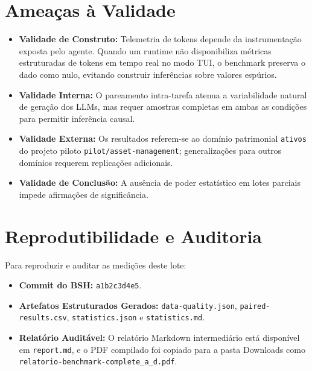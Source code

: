 \documentclass[10pt,a4paper]{article}
\begin{document}
\section{Ameaças à Validade}
\begin{itemize}
  \item \textbf{Validade de Construto:} Telemetria de tokens depende da instrumentação exposta pelo agente. Quando um runtime não disponibiliza métricas estruturadas de tokens em tempo real no modo TUI, o benchmark preserva o dado como nulo, evitando construir inferências sobre valores espúrios.
  \item \textbf{Validade Interna:} O pareamento intra-tarefa atenua a variabilidade natural de geração dos LLMs, mas requer amostras completas em ambas as condições para permitir inferência causal.
  \item \textbf{Validade Externa:} Os resultados referem-se ao domínio patrimonial \texttt{ativos} do projeto piloto \texttt{pilot/asset-management}; generalizações para outros domínios requerem replicações adicionais.
  \item \textbf{Validade de Conclusão:} A ausência de poder estatístico em lotes parciais impede afirmações de significância.
\end{itemize}

\section{Reprodutibilidade e Auditoria}
Para reproduzir e auditar as medições deste lote:
\begin{itemize}
  \item \textbf{Commit do BSH:} \texttt{a1b2c3d4e5}.
  \item \textbf{Artefatos Estruturados Gerados:} \texttt{data-quality.json}, \texttt{paired-results.csv}, \texttt{statistics.json} e \texttt{statistics.md}.
  \item \textbf{Relatório Auditável:} O relatório Markdown intermediário está disponível em \texttt{report.md}, e o PDF compilado foi copiado para a pasta Downloads como \texttt{relatorio-benchmark-complete\_a\_d.pdf}.
\end{itemize}



\end{document}
